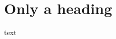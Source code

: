 \documentclass[11pt]{article}
\author{root}
\date{\today}
\title{}
\begin{document}
\tableofcontents

\section{Only a heading}
\label{sec:org30f68e0}
text
\end{document}
